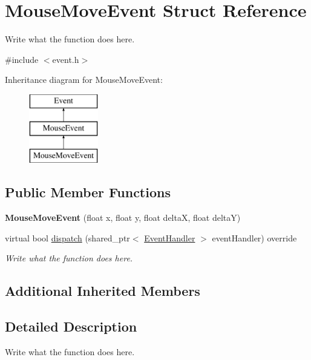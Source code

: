 \hypertarget{structMouseMoveEvent}{\section{Mouse\+Move\+Event Struct Reference}
\label{structMouseMoveEvent}
}


Write what the function does here.  




{\ttfamily \#include $<$event.\+h$>$}

Inheritance diagram for Mouse\+Move\+Event\+:\begin{figure}[H]
\begin{center}
\leavevmode
\includegraphics[height=3.000000cm]{structMouseMoveEvent}
\end{center}
\end{figure}
\subsection*{Public Member Functions}
\begin{DoxyCompactItemize}
\item 
\hypertarget{structMouseMoveEvent_abf421414902d34aa2d9435cc485fc4c8}{{\bfseries Mouse\+Move\+Event} (float x, float y, float delta\+X, float delta\+Y)}\label{structMouseMoveEvent_abf421414902d34aa2d9435cc485fc4c8}

\item 
virtual bool \hyperlink{structMouseMoveEvent_a2718ebd4f6f40d533773e59530372d62}{dispatch} (shared\+\_\+ptr$<$ \hyperlink{structEventHandler}{Event\+Handler} $>$ event\+Handler) override
\begin{DoxyCompactList}\small\item\em Write what the function does here. \end{DoxyCompactList}\end{DoxyCompactItemize}
\subsection*{Additional Inherited Members}


\subsection{Detailed Description}
Write what the function does here. 

